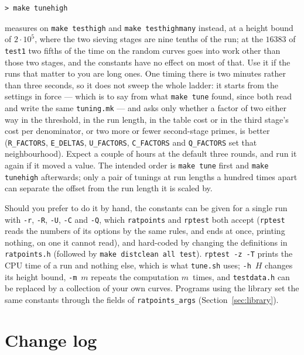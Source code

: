 \documentclass[12pt,a4paper,oneside]{amsart}
\begin{document}
\begin{verbatim}
> make tunehigh
\end{verbatim}
measures on \texttt{make testhigh} and \texttt{make testhighmany} instead,
at a height bound of $2\cdot10^5$, where the two sieving stages are nine
tenths of the run; at the $16383$ of \texttt{test1} two fifths of the time on
the random curves goes into work other than those two stages, and the
constants have no effect on most of that.
Use it if the runs that matter to you are long ones. One timing there is two
minutes rather than three seconds, so it does not sweep the whole ladder: it
starts from the settings in force --- which is to say from what \texttt{make
tune} found, since both read and write the same \texttt{tuning.mk} --- and
asks only whether a factor of two either way in the threshold, in the run
length, in the table cost or in the third stage's cost per denominator, or
two more or fewer second-stage primes, is better (\texttt{R\_FACTORS},
\texttt{E\_DELTAS}, \texttt{U\_FACTORS}, \texttt{C\_FACTORS} and
\texttt{Q\_FACTORS} set that neighbourhood). Expect a couple of hours at the
default three rounds, and run it again if it moved a value. The intended
order is \texttt{make tune} first and \texttt{make tunehigh} afterwards;
only a pair of tunings at run lengths a hundred times apart can separate the
offset from the run length it is scaled by.

Should you prefer to do it by hand, the constants can be given for a single
run with \verb+-r+, \verb+-R+, \verb+-U+, \verb+-C+ and \verb+-Q+, which
\texttt{ratpoints} and \texttt{rptest} both accept (\texttt{rptest} reads
the numbers of its options by the same rules, and ends at once, printing
nothing, on one it cannot read), and hard-coded by
changing the definitions in \texttt{ratpoints.h} (followed by \texttt{make
distclean all test}). \texttt{rptest -z -T} prints the CPU time of a run and
nothing else, which is what \texttt{tune.sh} uses; \verb+-h+~$H$ changes its
height bound, \verb+-m+~$m$ repeats the computation $m$~times, and
\texttt{testdata.h} can be replaced by a collection of your own curves.
Programs using the library set the same constants through the fields of
\texttt{ratpoints\_args} (Section~\ref{sec:library}).


\section{Change log}\label{sec:changelog}
\end{document}
